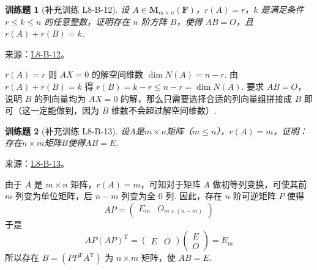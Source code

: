 \documentclass[UTF8,12pt,a4paper,fontset=fandol]{ctexart}
\newtheorem{exercise}{训练题}[section]
\begin{document}
\begin{exercise}[补充训练 L8-B-12]\label{prob:L8-B-12}
设 $A \in \mathbf{M}_{m \times n}(\mathbf{F})$，$r(A)=r$，$k$ 是满足条件 $r \leqslant k \leqslant n$ 的任意整数，证明存在 $n$ 阶方阵 $B$，使得 $AB=O$，且 $r(A)+r(B)=k$.
\end{exercise}
\noindent 来源：\href{https://github.com/yhwu-is/Linear-Algebra-Left-Undone/blob/new/%E8%AE%B2%E4%B9%89/%E4%B8%93%E9%A2%98/8%20%E7%9B%B8%E6%8A%B5%E6%A0%87%E5%87%86%E5%BD%A2.tex}{L8-B-12}。
\begin{solve}
$r(A)=r$ 则 $AX=0$ 的解空间维数 $\dim N(A) = n-r$. 由 $r(A)+r(B)=k$ 得 $r(B)=k-r \leqslant n-r=\dim N(A)$. 要求 $AB=O$，说明 $B$ 的列向量均为 $AX=0$ 的解，那么只需要选择合适的列向量组拼接成 $B$ 即可（这一定能做到，因为 $B$ 维数不会超过解空间维数）.
\end{solve}

\begin{exercise}[补充训练 L8-B-13]\label{prob:L8-B-13}
设$A$是$m \times n$矩阵（$m \leqslant n$），$r(A)=m$，证明：存在$n \times m$矩阵$B$使得$AB=E$.
\end{exercise}
\noindent 来源：\href{https://github.com/yhwu-is/Linear-Algebra-Left-Undone/blob/new/%E8%AE%B2%E4%B9%89/%E4%B8%93%E9%A2%98/8%20%E7%9B%B8%E6%8A%B5%E6%A0%87%E5%87%86%E5%BD%A2.tex}{L8-B-13}。
\begin{solve}
由于 $A$ 是 $m\times n$ 矩阵，$r(A)=m$，可知对于矩阵 $A$ 做初等列变换，可使其前 $m$ 列变为单位矩阵，后 $n-m$ 列变为全 0 列. 因此，存在 $n$ 阶可逆矩阵 $P$ 使得
          \[AP=\begin{pmatrix}E_m & O_{m\times (n-m)}\end{pmatrix}\]
          于是\[AP(AP)^{\mathrm{T}} = \begin{pmatrix}E & O\end{pmatrix} \begin{pmatrix}E \\ O\end{pmatrix}=E_m\]
          所以存在 $B=(PP^{\mathrm{T}}A^{\mathrm{T}})$ 为 $n\times m$ 矩阵，使 $AB=E$.
\end{solve}
\end{document}
